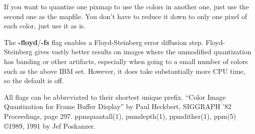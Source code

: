 If you want to quantize one pixmap to use the colors in another one,
just use the second one as the mapfile.
You don't have to reduce it down to only one pixel of each color,
just use it as is.
\par
The
{\bf -floyd}{\rm /}{\bf -fs}
flag enables a Floyd-Steinberg error diffusion step.
Floyd-Steinberg gives vastly better results on images where the unmodified
quantization has banding or other artifacts, especially when going to a
small number of colors such as the above IBM set.
However, it does take substantially more CPU time, so the default is off.
\par
All flags can be abbreviated to their shortest unique prefix.
``Color Image Quantization for Frame Buffer Display'' by Paul Heckbert,
SIGGRAPH '82 Proceedings, page 297.
ppmquantall(1), pnmdepth(1), ppmdither(1), ppm(5)
\copyright 1989, 1991 by Jef Poskanzer.
%
 
%

\newpage
%

